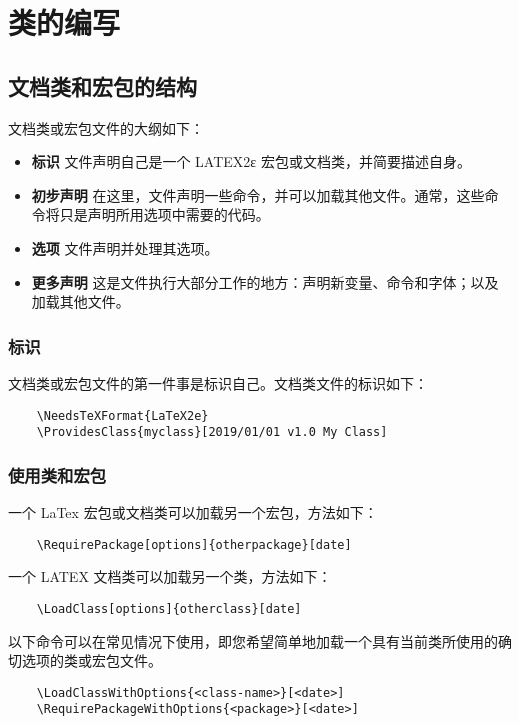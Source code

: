\chapter{类的编写}\label{chap:cls}

\section{文档类和宏包的结构}\label{sec:cls-struct}
文档类或宏包文件的大纲如下：
\begin{itemize}
    \item \textbf{标识} 文件声明自己是一个 LATEX2ε 宏包或文档类，并简要描述自身。
    \item \textbf{初步声明} 在这里，文件声明一些命令，并可以加载其他文件。通常，这些命令将只是声明所用选项中需要的代码。
    \item \textbf{选项} 文件声明并处理其选项。
    \item \textbf{更多声明} 这是文件执行大部分工作的地方：声明新变量、命令和字体；以及加载其他文件。
\end{itemize}

\subsection{标识}\label{subsec:cls-id}
文档类或宏包文件的第一件事是标识自己。文档类文件的标识如下：
\begin{lstlisting}
    \NeedsTeXFormat{LaTeX2e}
    \ProvidesClass{myclass}[2019/01/01 v1.0 My Class]
\end{lstlisting}

\subsection{使用类和宏包}\label{subsec:cls-use}
一个 LaTex 宏包或文档类可以加载另一个宏包，方法如下：
\begin{lstlisting}
    \RequirePackage[options]{otherpackage}[date]
\end{lstlisting}

一个 LATEX 文档类可以加载另一个类，方法如下：
\begin{lstlisting}
    \LoadClass[options]{otherclass}[date]
\end{lstlisting}

以下命令可以在常见情况下使用，即您希望简单地加载一个具有当前类所使用的确切选项的类或宏包文件。
\begin{lstlisting}
    \LoadClassWithOptions{<class-name>}[<date>]
    \RequirePackageWithOptions{<package>}[<date>]
\end{lstlisting}

